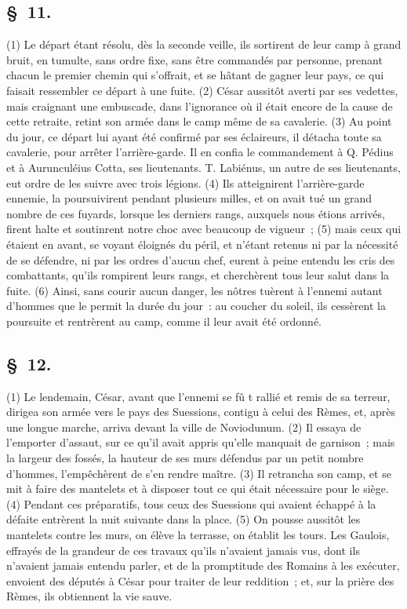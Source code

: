 \documentclass[french,twoside]{book} %
\begin{document}
\subsection[{§ 11.}]{ \textsc{§ 11.} }
\noindent (1) Le départ étant résolu, dès la seconde veille, ils sortirent de leur camp à grand bruit, en tumulte, sans ordre fixe, sans être commandés par personne, prenant chacun le premier chemin qui s’offrait, et se hâtant de gagner leur pays, ce qui faisait ressembler ce départ à une fuite. (2) César aussitôt averti par ses vedettes, mais craignant une embuscade, dans l’ignorance où il était encore de la cause de cette retraite, retint son armée dans le camp même de sa cavalerie. (3) Au point du jour, ce départ lui ayant été confirmé par ses éclaireurs, il détacha toute sa cavalerie, pour arrêter l’arrière-garde. Il en confia le commandement à Q. Pédius et à Aurunculéius Cotta, ses lieutenants. T. Labiénus, un autre de ses lieutenants, eut ordre de les suivre avec trois légions. (4) Ils atteignirent l’arrière-garde ennemie, la poursuivirent pendant plusieurs milles, et on avait tué un grand nombre de ces fuyards, lorsque les derniers rangs, auxquels nous étions arrivés, firent halte et soutinrent notre choc avec beaucoup de vigueur ; (5) mais ceux qui étaient en avant, se voyant éloignés du péril, et n’étant retenus ni par la nécessité de se défendre, ni par les ordres d’aucun chef, eurent à peine entendu les cris des combattants, qu’ils rompirent leurs rangs, et cherchèrent tous leur salut dans la fuite. (6) Ainsi, sans courir aucun danger, les nôtres tuèrent à l’ennemi autant d’hommes que le permit la durée du jour : au coucher du soleil, ils cessèrent la poursuite et rentrèrent au camp, comme il leur avait été ordonné.
\subsection[{§ 12.}]{ \textsc{§ 12.} }
\noindent (1) Le lendemain, César, avant que l’ennemi se fû t rallié et remis de sa terreur, dirigea son armée vers le pays des Suessions, contigu à celui des Rèmes, et, après une longue marche, arriva devant la ville de Noviodunum. (2) Il essaya de l’emporter d’assaut, sur ce qu’il avait appris qu’elle manquait de garnison ; mais la largeur des fossés, la hauteur de ses murs défendus par un petit nombre d’hommes, l’empêchèrent de s’en rendre maître. (3) Il retrancha son camp, et se mit à faire des mantelets et à disposer tout ce qui était nécessaire pour le siège. (4) Pendant ces préparatifs, tous ceux des Suessions qui avaient échappé à la défaite entrèrent la nuit suivante dans la place. (5) On pousse aussitôt les mantelets contre les murs, on élève la terrasse, on établit les tours. Les Gaulois, effrayés de la grandeur de ces travaux qu’ils n’avaient jamais vus, dont ils n’avaient jamais entendu parler, et de la promptitude des Romains à les exécuter, envoient des députés à César pour traiter de leur reddition ; et, sur la prière des Rèmes, ils obtiennent la vie sauve.
\end{document}
